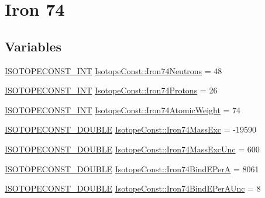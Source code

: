 \hypertarget{group___isotope_const-_iron-_fe74}{}\section{Iron 74}
\label{group___isotope_const-_iron-_fe74}
\subsection*{Variables}
\begin{DoxyCompactItemize}
\item 
\mbox{\hyperlink{group___isotope_const-_macros_ga5f18360b3e99483a35c32d789e62621c}{I\+S\+O\+T\+O\+P\+E\+C\+O\+N\+S\+T\+\_\+\+I\+NT}} \mbox{\hyperlink{group___isotope_const-_iron-_fe74_ga4c130fe27e4cb57262f945733cf5b0cd}{Isotope\+Const\+::\+Iron74\+Neutrons}} = 48
\item 
\mbox{\hyperlink{group___isotope_const-_macros_ga5f18360b3e99483a35c32d789e62621c}{I\+S\+O\+T\+O\+P\+E\+C\+O\+N\+S\+T\+\_\+\+I\+NT}} \mbox{\hyperlink{group___isotope_const-_iron-_fe74_gaccbb762acacd5a67dee638558673bd16}{Isotope\+Const\+::\+Iron74\+Protons}} = 26
\item 
\mbox{\hyperlink{group___isotope_const-_macros_ga5f18360b3e99483a35c32d789e62621c}{I\+S\+O\+T\+O\+P\+E\+C\+O\+N\+S\+T\+\_\+\+I\+NT}} \mbox{\hyperlink{group___isotope_const-_iron-_fe74_gaf3810e1f05d79879d1061a2e40e8f758}{Isotope\+Const\+::\+Iron74\+Atomic\+Weight}} = 74
\item 
\mbox{\hyperlink{group___isotope_const-_macros_ga8f45a7272ce02c0b4c65c44636ed719a}{I\+S\+O\+T\+O\+P\+E\+C\+O\+N\+S\+T\+\_\+\+D\+O\+U\+B\+LE}} \mbox{\hyperlink{group___isotope_const-_iron-_fe74_gabcfeb54d7b63a5bb815c29786387436b}{Isotope\+Const\+::\+Iron74\+Mass\+Exc}} = -\/19590
\item 
\mbox{\hyperlink{group___isotope_const-_macros_ga8f45a7272ce02c0b4c65c44636ed719a}{I\+S\+O\+T\+O\+P\+E\+C\+O\+N\+S\+T\+\_\+\+D\+O\+U\+B\+LE}} \mbox{\hyperlink{group___isotope_const-_iron-_fe74_ga5ad69bfeec4ca13d465410d45fc4e83d}{Isotope\+Const\+::\+Iron74\+Mass\+Exc\+Unc}} = 600
\item 
\mbox{\hyperlink{group___isotope_const-_macros_ga8f45a7272ce02c0b4c65c44636ed719a}{I\+S\+O\+T\+O\+P\+E\+C\+O\+N\+S\+T\+\_\+\+D\+O\+U\+B\+LE}} \mbox{\hyperlink{group___isotope_const-_iron-_fe74_gab60b5e06a63adf86e1a855dcd094d8c3}{Isotope\+Const\+::\+Iron74\+Bind\+E\+PerA}} = 8061
\item 
\mbox{\hyperlink{group___isotope_const-_macros_ga8f45a7272ce02c0b4c65c44636ed719a}{I\+S\+O\+T\+O\+P\+E\+C\+O\+N\+S\+T\+\_\+\+D\+O\+U\+B\+LE}} \mbox{\hyperlink{group___isotope_const-_iron-_fe74_gad7b65c73cca5d3515a8d6f003616461f}{Isotope\+Const\+::\+Iron74\+Bind\+E\+Per\+A\+Unc}} = 8

\end{DoxyCompactItemize}
